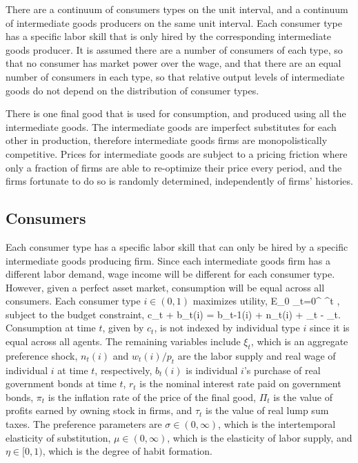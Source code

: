 There are a continuum of consumers types on the unit interval, and a continuum of intermediate goods producers on the same unit interval.  Each consumer type has a specific labor skill that is only hired by the corresponding intermediate goods producer.  It is assumed there are a number of consumers of each type, so that no consumer has market power over the wage, and that there are an equal number of consumers in each type, so that relative output levels of intermediate goods do not depend on the distribution of consumer types.

There is one final good that is used for consumption, and produced using all the intermediate goods.  The intermediate goods are imperfect substitutes for each other in production, therefore intermediate goods firms are monopolistically competitive.  Prices for intermediate goods are subject to a  pricing friction where only a fraction of firms are able to re-optimize their price every period, and the firms fortunate to do so is randomly determined, independently of firms' histories.

\subsection{Consumers}
Each consumer type has a specific labor skill that can only be hired by a specific intermediate goods producing firm.  Since each intermediate goods firm has a different labor demand, wage income will be different for each consumer type.  However, given a perfect asset market, consumption will be equal across all consumers.  Each consumer type $i \in (0,1)$ maximizes utility,
\bdm E_0 \sum_{t=0}^{\infty} \beta^t , \edm
subject to the budget constraint,
\bdm c_t + b_t(i) =  b_{t-1}(i) +  n_t(i) + \Pi_t - \tau_t. \edm
Consumption at time $t$, given by $c_t$, is not indexed by individual type $i$ since it is equal across all agents.  The remaining variables include $\xi_t$, which is an aggregate preference shock, $n_t(i)$ and $w_t(i)/p_t$ are the labor supply and real wage of individual $i$ at time $t$, respectively, $b_t(i)$ is individual $i$'s purchase of real government bonds at time $t$, $r_t$ is the nominal interest rate paid on government bonds, $\pi_t$ is the inflation rate of the price of the final good, $\Pi_t$ is the value of profits earned by owning stock in firms, and $\tau_t$ is the value of real lump sum taxes.  The preference parameters are $\sigma \in (0,\infty)$, which is the intertemporal elasticity of substitution, $\mu \in (0,\infty)$, which is the elasticity of labor supply, and $\eta \in [0,1)$, which is the degree of habit formation.  

